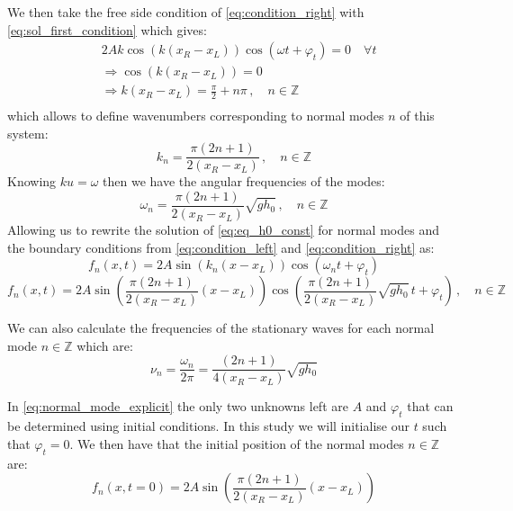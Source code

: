 We then take the free side condition of \autoref{eq:condition_right} with \autoref{eq:sol_first_condition} which gives:
\[
    \begin{aligned}
        & 2A k \cos(k(x_R-x_L))\cos(\omega t + \varphi_t) = 0 \quad \forall t \\
        & \Rightarrow \cos(k(x_R-x_L)) = 0 \\
        & \Rightarrow k(x_R-x_L) = \frac{\pi}{2} + n\pi\,, \quad n \in \mathbb{Z} \\
    \end{aligned}
\]
which allows to define wavenumbers corresponding to normal modes $n$ of this system:
\begin{equation}
    k_n = \frac{\pi(2n + 1)}{2(x_R-x_L)}\,, \quad n \in \mathbb{Z}
    \label{eq:wavenumber_mode}
\end{equation}
Knowing $ku = \omega$ then we have the angular frequencies of the modes:
\begin{equation}
    \omega_n = \frac{\pi(2n + 1)}{2(x_R-x_L)} \sqrt{gh_0}\,, \quad n \in \mathbb{Z}
    \label{eq:angular_mode}
\end{equation}
Allowing us to rewrite the solution of \autoref{eq:eq_h0_const} for normal modes and the boundary conditions from \autoref{eq:condition_left} and \autoref{eq:condition_right} as:
\begin{equation}
    f_n(x,t) = 2A\sin(k_n(x - x_L))\cos(\omega_n t + \varphi_t)
    \label{eq:normal_mode_simple}
\end{equation}
\begin{equation}
    f_n(x,t) = 2A\sin\left(\frac{\pi(2n + 1)}{2(x_R-x_L)}(x - x_L)\right)\cos\left(\frac{\pi(2n + 1)}{2(x_R-x_L)} \sqrt{gh_0} \, t + \varphi_t\right)\,, \quad n \in \mathbb{Z}
    \label{eq:normal_mode_explicit}
\end{equation}

We can also calculate the frequencies of the stationary waves for each normal mode $n \in \mathbb{Z}$ which are:
\begin{equation}
    \nu_n = \frac{\omega_n}{2\pi} = \frac{(2n + 1)}{4(x_R-x_L)} \sqrt{gh_0}
    \label{eq:normal_frequency}
\end{equation}

In \autoref{eq:normal_mode_explicit} the only two unknowns left are $A$ and $\varphi_t$ that can be determined using initial conditions. In this study we will initialise our $t$ such that $\varphi_t = 0$. We then have that the initial position of the normal modes $n \in \mathbb{Z}$ are:
\begin{equation}
    f_n(x,t=0) = 2A\sin\left(\frac{\pi(2n + 1)}{2(x_R-x_L)}(x - x_L)\right)
    \label{eq:normal_initial}
\end{equation}


